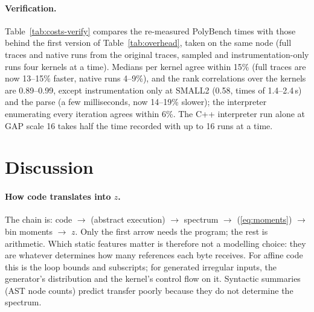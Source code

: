 \documentclass[11pt]{article}
\newcommand{\fittable}[1]{\sbox{\fitbox}{}%
  \ifdim\wd\fitbox>\linewidth\resizebox{\linewidth}{!}{\usebox{\fitbox}}\else\usebox{\fitbox}\fi}
\newcommand{\tabref}[1]{Table~\ref{#1}}
\begin{document}
\begin{table}[!htbp]
\centering\small
\caption[Cost of the analysis steps]{The analysis steps on PolyBench, per held-out kernel and split (milliseconds),
and the parse-based descriptors at SMALL2 and MEDIUM.}
\label{tab:costs-steps}
\fittable{tables/costs_steps.tex}
\end{table}

\paragraph{Verification.} \tabref{tab:costs-verify} compares the re-measured PolyBench times with those behind the
first version of \tabref{tab:overhead}, taken on the same node (full traces and native runs from the original
traces, sampled and instrumentation-only runs four kernels at a time). Medians per kernel agree within 15\% (full
traces are now 13--15\% faster, native runs 4--9\%), and the rank correlations over the kernels are 0.89--0.99,
except instrumentation only at SMALL2 (0.58, times of 1.4--2.4\,s) and the parse (a few milliseconds, now
14--19\% slower); the interpreter enumerating every iteration agrees within 6\%. The C++ interpreter run alone at GAP scale 16 takes half
the time recorded with up to 16 runs at a time.

\begin{table}[!htbp]
\centering\scriptsize
\caption[Re-measured against earlier times]{Re-measured times against the times used before (medians over the
PolyBench kernels or GAP workloads, the median and range of the per-program ratio, and the Spearman correlation).}
\label{tab:costs-verify}
\fittable{tables/costs_verify.tex}
\end{table}

\clearpage
\section{Discussion}
\label{sec:discussion}

\paragraph{How code translates into $z$.}
The chain is: code $\to$ (abstract execution) $\to$ spectrum $\to$ (\eqref{eq:moments}) $\to$ bin moments $\to$
$z$. Only the first arrow needs the program; the rest is arithmetic. Which static features matter is therefore not a
modelling choice: they are whatever determines how many references each byte receives. For affine code this is the
loop bounds and subscripts; for generated irregular inputs, the generator's distribution and the kernel's control
flow on it. Syntactic summaries (AST node counts) predict transfer poorly because they do not determine the spectrum.
\end{document}
